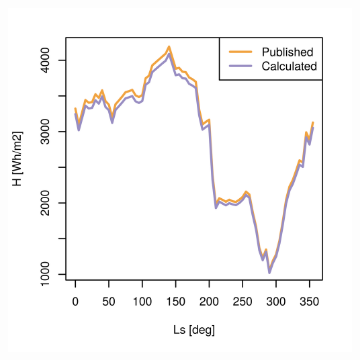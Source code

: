 \begin{figure}[H]
\captionsetup[subfigure]{justification=centering}
\vspace{-2ex}
\centering
    \setlength{\subfigureWidth}{0.50\textwidth}
    \setlength{\graphicsHeight}{50mm}
    \hypersetup{hidelinks=true}%
    \begin{subfigure}[t]{\subfigureWidth}
        \centering
            \includegraphics[height=\graphicsHeight]{sections/appendix/insolation-calculation-verification/plots/h-exp-calc-at-vl1-with-beta-65-deg.png}
            \label{fig:sub:comparative-global-insolation-at-vl1-beta-optimal-daily-variations}
    \end{subfigure}\hfill
    \begin{subfigure}[t]{\subfigureWidth}
        \centering

\end{subfigure}
\end{figure}
